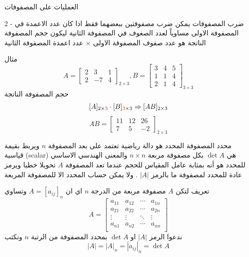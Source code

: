 	\begin{frame}{العمليات على المصفوفات}
		\begin{exampleblock}{2 - ضرب المصفوفات}
			يمكن ضرب مصفوفتين ببعضهما فقط اذا كان عدد الاعمدة في المصفوفة الاولى مساوياً لعدد الصغوف في المصفوفة الثانية ليكون حجم المصفوفة الناتجة هو عدد صفوف المصفوفة الاولى × عدد اعمدة المصفوفة الثانية
		\end{exampleblock}
		
		\begin{exampleblock}{مثال}
			\[
			A = 
			\begin{bmatrix}
				2 & 3 & 1\\
				2 & -7 &4
			\end{bmatrix}_{2\times 3}
			, B =
			\begin{bmatrix}
				3 &4& 5\\
				1 &1 &4\\
				2 &1& 4 
			\end{bmatrix}_{3\times 3}
			\]
			حجم المصفوفة الناتجة 
			\[
			[A]_{2\times \textcolor{red}{3}}\cdot [B]_{\textcolor{red}{3}\times 3} \Rightarrow [AB]_{2\times 3}
			\]
			\[
			AB = 
			\begin{bmatrix}
				11& 12& 26\\
				7 &5& -2 
			\end{bmatrix}_{2\times 3}
			\]
		\end{exampleblock}
	\end{frame}
	
	\begin{frame}
		\begin{exampleblock}{محدد المصفوفة}
			المحدد هو دالة رياضية تعتمد على بعد المصفوفة $n$ ويربط بقيمة قياسية (scalar) هي $\det A$ بكل مصفوفة مربعة $n\times n$ والمعنى الهندسي الاساسي للمحدد هو أنه بمثابة عامل المقياس للحجم عندما تعد المصفوفة $A$ تحويلا خطيا ويرمز عادة للمحدد لمصفوفة ما بالرمز $|A|$ . ولا يمكن حساب المحدد الا للمصفوفة المربعة
		\end{exampleblock}
		
		\begin{exampleblock}{تعريف}
			 لتكن $A$ مصفوفة مربعة من الدرجة $n$ اي ان $A=[a_{ij}]_n$ وتساوي
			\[
			A =
			\begin{bmatrix}
				a_{11} & a_{12} & \cdots & a_{1n}\\
				a_{21} & a_{22} & \cdots & a_{2n}\\
				\vdots & \vdots & \ddots & \vdots\\
				a_{n1} & a_{n2} & \cdots & a_{nn}\\
			\end{bmatrix}
			\] 
			ندعوا الرمز $|A|$ او $\det A$ بمحدد المصفوفة من الرتبة $n$ ونكتب
			\[
			|A| = |A|_n = |a_{ij}|_{n} = \det A
			\]
		\end{exampleblock}
	\end{frame}
	
